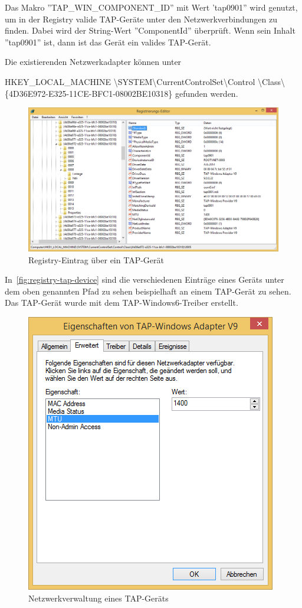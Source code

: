 Das Makro ''TAP\_WIN\_COMPONENT\_ID'' mit Wert 'tap0901'' wird genutzt, um in der Registry
valide TAP-Geräte unter den Netzwerkverbindungen zu finden. Dabei wird der String-Wert ''ComponentId''
überprüft. Wenn sein Inhalt ''tap0901'' ist, dann ist das Gerät ein valides TAP-Gerät.

Die existierenden Netzwerkadapter können unter {HKEY\_LOCAL\_MACHINE\linebreak
\textbackslash{}SYSTEM\textbackslash{}CurrentControlSet\textbackslash{}Control
\textbackslash{}Class\textbackslash{}\{4D36E972-E325-11CE-BFC1-08002BE10318\} gefunden werden.

\begin{figure}[!h]
\caption{Registry-Eintrag über ein TAP-Gerät}
\label{fig:registry-tap-device}
\includegraphics[width=\textwidth]{Windows-Registry-TAP-Device.png}
\end{figure}

In~\autoref{fig:registry-tap-device} sind die verschiedenen Einträge eines Geräts unter
dem oben genannten Pfad zu sehen beispielhaft an einem TAP-Gerät zu sehen. Das TAP-Gerät
wurde mit dem TAP-Windows6-Treiber erstellt.

\begin{figure}[!h]
\caption{Netzwerkverwaltung eines TAP-Geräts}
\label{fig:networkmanager-extended}
\includegraphics{Windows-NetworkManager-Extended.png}
\end{figure}

}
